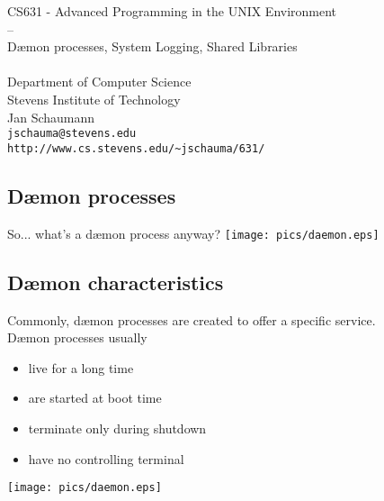 \documentclass[xga]{xdvislides}
\begin{document}
\setfontphv

\lhead{\slidetitle}
\cfoot{\relax}
\rfoot{\Gray{\today}}

\vspace*{\fill}
\begin{center}
	\Hugesize
		CS631 - Advanced Programming in the UNIX Environment\\
		-- \\
		D\ae mon processes, System Logging, Shared Libraries\\
	\hspace*{5mm}\blueline\\ [1em]
	\Normalsize
		Department of Computer Science\\
		Stevens Institute of Technology\\
		Jan Schaumann\\
		\verb+jschauma@stevens.edu+\\
		\verb+http://www.cs.stevens.edu/~jschauma/631/+
\end{center}
\vspace*{\fill}

\subsection{D\ae mon processes}
So... what's a d\ae mon process anyway?
\vfill
\hfill\texttt{[image: pics/daemon.eps]} \\

\subsection{D\ae mon characteristics}
Commonly, d\ae mon processes are created to offer a specific service.
\\

D\ae mon processes usually
\begin{itemize}
	\item live for a long time
	\item are started at boot time
	\item terminate only during shutdown
	\item have no controlling terminal
\end{itemize}

\vfill
\hfill\texttt{[image: pics/daemon.eps]} \\
\end{document}
